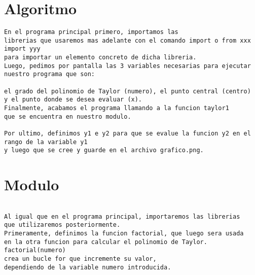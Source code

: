 \section{Algoritmo}
\label{Apendice2:label}

\begin{center}
\begin{footnotesize}
\begin{verbatim}
En el programa principal primero, importamos las 
librerias que usaremos mas adelante con el comando import o from xxx import yyy 
para importar un elemento concreto de dicha libreria.
Luego, pedimos por pantalla las 3 variables necesarias para ejecutar 
nuestro programa que son:

el grado del polinomio de Taylor (numero), el punto central (centro) 
y el punto donde se desea evaluar (x). 
Finalmente, acabamos el programa llamando a la funcion taylor1 
que se encuentra en nuestro modulo.

Por ultimo, definimos y1 e y2 para que se evalue la funcion y2 en el rango de la variable y1
y luego que se cree y guarde en el archivo grafico.png.
\end{verbatim}
\end{footnotesize}
\end{center}

\section{Modulo}
\label{Apendice2:label2}

\begin{center}
\begin{footnotesize}
\begin{verbatim}

Al igual que en el programa principal, importaremos las librerias 
que utilizaremos posteriormente. 
Primeramente, definimos la funcion factorial, que luego sera usada 
en la otra funcion para calcular el polinomio de Taylor. factorial(numero) 
crea un bucle for que incremente su valor, 
dependiendo de la variable numero introducida.
 
\end{verbatim}
\end{footnotesize}
\end{center}

